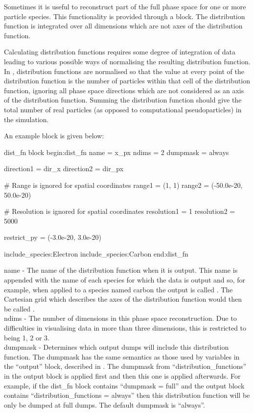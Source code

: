 Sometimes it is useful to reconstruct part of the
full phase space for one or more particle species.
This functionality is provided through a  block. The
distribution function is integrated over all dimensions which are not axes of
the distribution function.

Calculating distribution functions requires some degree of integration of data
leading to various possible ways of normalising the resulting distribution
function. In {\EPOCH}, distribution functions are normalised so that the value
at every point of the distribution function is the number of particles within
that cell of the distribution function, ignoring all phase space directions
which are not considered as an axis of the distribution function. Summing the
distribution function should give the total number of real particles
(as opposed to computational pseudoparticles) in the
simulation.

An example  block is given below:
{\samepage
\begin{lboxverbatim}{dist\_fn block}
begin:dist_fn
   name = x_px
   ndims = 2
   dumpmask = always

   direction1 = dir_x
   direction2 = dir_px

   # Range is ignored for spatial coordinates
   range1 = (1, 1)
   range2 = (-50.0e-20, 50.0e-20)

   # Resolution is ignored for spatial coordinates
   resolution1 = 1
   resolution2 = 5000

   restrict_py = (-3.0e-20, 3.0e-20)

   include_species:Electron
   include_species:Carbon
end:dist_fn
\end{lboxverbatim}
}

{\emphtext name} - The name of the distribution function when it is
output. This name is appended with the name of each species for which the data
is output and so, for example, when applied to a species named
carbon the output is called . The Cartesian grid
which describes the axes of the distribution function would then be called
.\\

{\emphtext ndims} - The number of dimensions in this phase space
reconstruction. Due to difficulties in visualising data in more than three
dimensions, this is restricted to being 1, 2 or 3.\\

{\emphtext dumpmask} - Determines which output dumps will include this
distribution function. The dumpmask has the same semantics as those used
by variables in the ``output'' block, described in .
The dumpmask from ``distribution\_functions'' in the output block is applied
first and then this one is applied afterwards. For example, if the
dist\_fn block contains ``dumpmask = full'' and the output block contains
``distribution\_functions = always'' then this distribution function will be
only be dumped at full dumps. The default dumpmask is ``always''.\\

